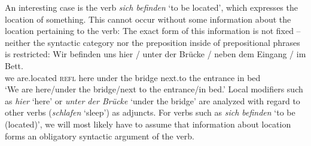 An interesting case is the verb \emph{sich befinden} `to be located', which expresses the location of something. This cannot occur without
some information about the location pertaining to the verb:
\z
The exact form of this information is not fixed -- neither the syntactic category nor the
preposition inside of prepositional phrases is restricted:
\ea
\gll Wir befinden uns hier / unter der Brücke / neben dem Eingang / im Bett.\\
     we are.located \textsc{refl} here {} under the bridge {} next.to the entrance {} in bed\\
\glt `We are here/under the bridge/next to the entrance/in bed.'
\z
Local modifiers such as \emph{hier} `here' or \emph{unter der Brücke} `under the bridge' are analyzed with regard to
other verbs (\eg \emph{schlafen} `sleep') as adjuncts. For verbs such as \emph{sich befinden} `to be (located)', we will most likely
have to assume that information about location forms an obligatory syntactic argument of the verb.
%
%
